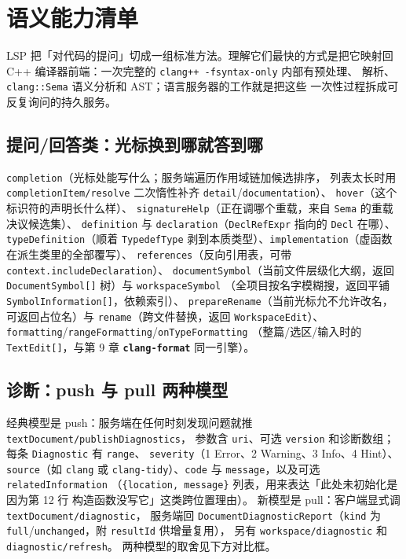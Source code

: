 \documentclass[12pt,a4paper,fontset=fandol]{ctexbook}
\newcommand{\Bk}{\discretionary{}{}{}}
\newcommand{\Lib}[1]{\textbf{\texttt{#1}}}
\newcommand{\Lang}[1]{\textsf{#1}}
\newcommand{\CPP}{\Lang{C++}}
\newcommand{\Fmt}{\Lib{clang-format}}
\begin{document}
\section{语义能力清单}\label{sec:ch04-s4}

LSP 把「对代码的提问」切成一组标准方法。理解它们最快的方式是把它映射回
\CPP{} 编译器前端：一次完整的 \texttt{clang++ -fsyntax-only} 内部有预处理、
解析、\texttt{clang::Sema} 语义分析和 AST；语言服务器的工作就是把这些
一次性过程拆成可反复询问的持久服务。

\subsection{提问/回答类：光标换到哪就答到哪}
\texttt{completion}（光标处能写什么；服务端遍历作用域链加候选排序，
列表太长时用 \texttt{completionItem/resolve} 二次惰性补齐
\texttt{detail}/{\Bk}\texttt{documentation}）、
\texttt{hover}（这个标识符的声明长什么样）、
\texttt{signatureHelp}（正在调哪个重载，来自 \texttt{Sema} 的重载决议候选集）、
\texttt{definition} 与 \texttt{declaration}（\texttt{DeclRefExpr} 指向的
\texttt{Decl} 在哪）、\texttt{typeDefinition}（顺着 \texttt{TypedefType}
剥到本质类型）、\texttt{implementation}（虚函数在派生类里的全部覆写）、
\texttt{references}（反向引用表，可带 \texttt{context.includeDeclaration}）、
\texttt{documentSymbol}（当前文件层级化大纲，返回
\texttt{DocumentSymbol[]} 树）与 \texttt{workspaceSymbol}
（全项目按名字模糊搜，返回平铺 \texttt{SymbolInformation[]}，依赖索引）、
\texttt{prepareRename}（当前光标允不允许改名，可返回占位名）与
\texttt{rename}（跨文件替换，返回 \texttt{WorkspaceEdit}）、
\texttt{formatting}/{\Bk}\texttt{rangeFormatting}/{\Bk}\texttt{onTypeFormatting}
（整篇/选区/输入时的 \texttt{TextEdit[]}，与第 9 章 \Fmt{} 同一引擎）。

\subsection{诊断：push 与 pull 两种模型}
经典模型是 push：服务端在任何时刻发现问题就推
\texttt{text{\Bk}Document/}\hspace{0pt}\texttt{publish}\hspace{0pt}\texttt{Diagnostics}，
参数含 \texttt{uri}、可选 \texttt{version}
和诊断数组；每条 \texttt{Diagnostic} 有 \texttt{range}、
\texttt{severity}（1 Error、2 Warning、3 Info、4 Hint）、
\texttt{source}（如 \texttt{clang} 或 \texttt{clang-tidy}）、\texttt{code}
与 \texttt{message}，以及可选 \texttt{related{\Bk}Information}
（\texttt{\{location, message\}} 列表，用来表达「此处未初始化是因为第 12 行
构造函数没写它」这类跨位置理由）。
新模型是 pull：客户端显式调 \texttt{text{\Bk}Document/{\Bk}diagnostic}\Bk{}，
服务端回 \texttt{Document{\Bk}Diagnostic{\Bk}Report}（\texttt{kind} 为
\texttt{full}/{\Bk}\texttt{unchanged}，附 \texttt{resultId} 供增量复用），
另有 \texttt{workspace/{\Bk}diagnostic} 和 \texttt{diagnostic/{\Bk}refresh}。
两种模型的取舍见下方对比框。
\end{document}
